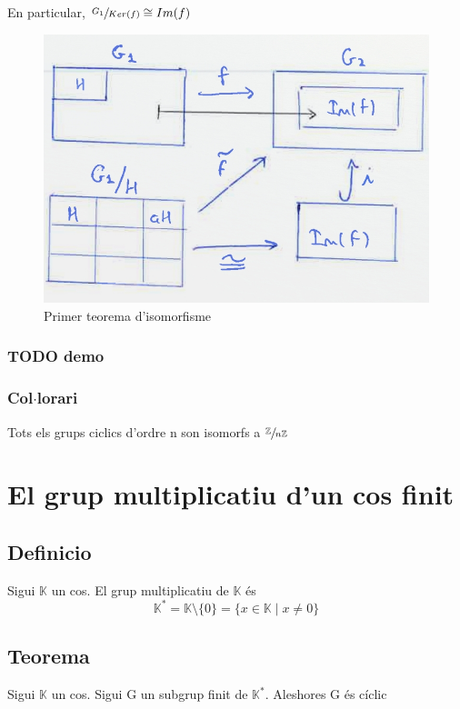 \documentclass[11pt]{article}
\begin{document}
En particular, \(\sfrac{G_1}{Ker(f)} \cong Im(f)\)
\begin{figure}[htbp]
\centering
\includegraphics[width=.9\linewidth]{./images/primeriso.jpg}
\caption{\label{fig:org2501d25}
Primer teorema d'isomorfisme}
\end{figure}

\subsubsection{{\bfseries\sffamily TODO} demo}
\label{sec:org5cebc73}

\subsubsection{Col\(\cdot\)lorari}
\label{sec:org63e7750}
Tots els grups ciclics d'ordre n son isomorfs a \(\sfrac{\mathbb{Z}}{n\mathbb{Z}}\)

\section{El grup multiplicatiu d'un cos finit}
\label{sec:org4707214}

\subsection{Definicio}
\label{sec:org620864a}
Sigui \(\mathbb{K}\) un cos. El grup multiplicatiu de \(\mathbb{K}\) és \\
\begin{equation*}
\mathbb{K}^* = \mathbb{K} \setminus \{0\} = \{x \in \mathbb{K} \mid x \neq 0\}
\end{equation*}

\subsection{Teorema}
\label{sec:org104c809}
Sigui \(\mathbb{K}\) un cos. Sigui G un subgrup finit de \(\mathbb{K}^*\). Aleshores G és cíclic
\end{document}
